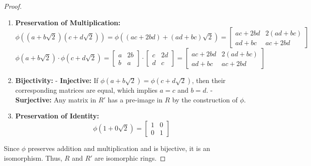 \documentclass[12pt]{amsart}
\theoremstyle{definition}
\numberwithin{equation}{section}
\theoremstyle{plain}
\begin{document}
\begin{exercise}{17}
\begin{proof}
\begin{enumerate}
        \item \textbf{Preservation of Multiplication:}
           \[
           \phi((a + b\sqrt{2})(c + d\sqrt{2})) = \phi((ac + 2bd) + (ad+bc)\sqrt{2}) = 
           \begin{bmatrix}
            ac + 2bd & 2(ad+bc) \\
            ad+bc & ac + 2bd
           \end{bmatrix}
           \]
           \[
           \phi(a + b\sqrt{2}) \cdot \phi(c + d\sqrt{2}) =
           \begin{bmatrix}
            a & 2b \\
            b & a
           \end{bmatrix} \cdot
           \begin{bmatrix}
            c & 2d \\
            d & c
           \end{bmatrix} =
           \begin{bmatrix}
            ac + 2bd & 2(ad+bc) \\
            ad+bc & ac + 2bd
           \end{bmatrix}
           \]
        
        \item \textbf{Bijectivity:}
           - \textbf{Injective:} If \( \phi(a + b\sqrt{2}) = \phi(c + d\sqrt{2}) \), then their corresponding matrices are equal, which implies \( a = c \) and \( b = d \).
           - \textbf{Surjective:} Any matrix in \( R' \) has a pre-image in \( R \) by the construction of \( \phi \).
        
        \item \textbf{Preservation of Identity:}
           \[
           \phi(1 + 0\sqrt{2}) = \begin{bmatrix} 1 & 0 \\ 0 & 1 \end{bmatrix}
           \]
    \end{enumerate}
    
    Since \( \phi \) preserves addition and multiplication and is bijective, it is an isomorphism. Thus, \( R \) and \( R' \) are isomorphic rings.
\end{proof}
\end{exercise}
\vspace*{20pt}
\end{document}
